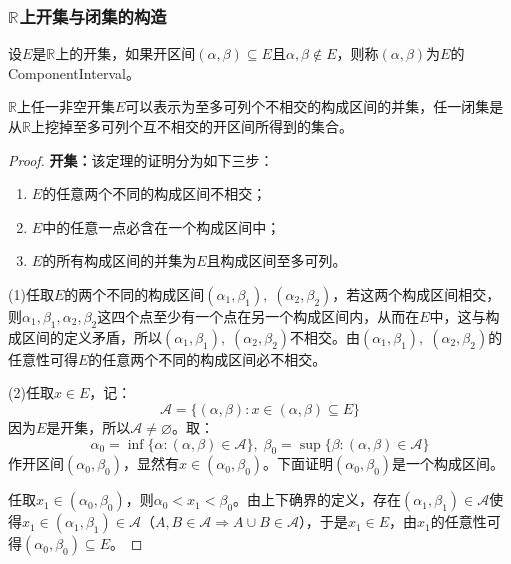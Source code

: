 \subsubsection{$\mathbb{R}^{}$上开集与闭集的构造}
\begin{definition}
	设$E$是$\mathbb{R}$上的开集，如果开区间$(\alpha,\beta)\subseteq E$且$\alpha,\beta\notin E$，则称$(\alpha,\beta)$为$E$的\gls{ComponentInterval}。
\end{definition}
\begin{theorem}\label{theo:ROpenClosedSetComponentInterval}
	$\mathbb{R}$上任一非空开集$E$可以表示为至多可列个不相交的构成区间的并集，任一闭集是从$\mathbb{R}$上挖掉至多可列个互不相交的开区间所得到的集合。
\end{theorem}
\begin{proof}
	\textbf{开集：}该定理的证明分为如下三步：
	\begin{enumerate}
		\item $E$的任意两个不同的构成区间不相交；
		\item $E$中的任意一点必含在一个构成区间中；
		\item $E$的所有构成区间的并集为$E$且构成区间至多可列。
	\end{enumerate}\par
	(1)任取$E$的两个不同的构成区间$(\alpha_1,\beta_1),\;(\alpha_2,\beta_2)$，若这两个构成区间相交，则$\alpha_1,\beta_1,\alpha_2,\beta_2$这四个点至少有一个点在另一个构成区间内，从而在$E$中，这与构成区间的定义矛盾，所以$(\alpha_1,\beta_1),\;(\alpha_2,\beta_2)$不相交。由$(\alpha_1,\beta_1),\;(\alpha_2,\beta_2)$的任意性可得$E$的任意两个不同的构成区间必不相交。\par
	(2)任取$x\in E$，记：
	\begin{equation*}
		\mathscr{A}=\{(\alpha,\beta):x\in(\alpha,\beta)\subseteq E\}
	\end{equation*}
	因为$E$是开集，所以$\mathscr{A}\ne\varnothing$。取：
	\begin{equation*}
		\alpha_0=\inf\{\alpha:(\alpha,\beta)\in \mathscr{A}\},\;
		\beta_0=\sup\{\beta:(\alpha,\beta)\in \mathscr{A}\}
	\end{equation*}
	作开区间$(\alpha_0,\beta_0)$，显然有$x\in(\alpha_0,\beta_0)$。下面证明$(\alpha_0,\beta_0)$是一个构成区间。\par
	任取$x_1\in(\alpha_0,\beta_0)$，则$\alpha_0<x_1<\beta_0$。由上下确界的定义，存在$(\alpha_1,\beta_1)\in\mathscr{A}$使得$x_1\in(\alpha_1,\beta_1)\in\mathscr{A}$（$A,B\in\mathscr{A}\Rightarrow A\cup B\in\mathscr{A}$），于是$x_1\in E$，由$x_1$的任意性可得$(\alpha_0,\beta_0)\subseteq E$。\par

\end{proof}
